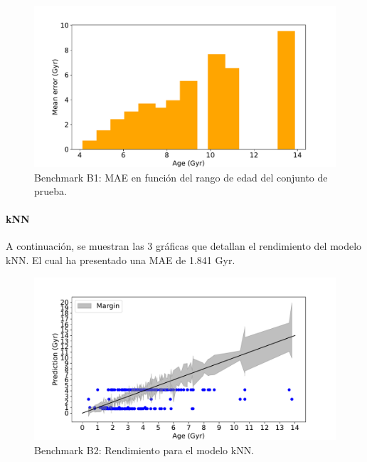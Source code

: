 \begin{figure}[H]
\begin{center}
 \includegraphics[width=0.8\linewidth]{Figuras/Experimentos/B_B1_gp_3.pdf}
\end{center}
\caption{Benchmark B1: MAE en función del rango de edad del conjunto de prueba.}
 \label{fig:benchB1_details_gp_3}
\end{figure}

\paragraph{kNN} 
A continuación, se muestran las 3 gráficas que detallan el rendimiento del modelo kNN. El cual ha presentado una MAE de 1.841 Gyr.

\begin{figure}[H]
\begin{center}
 \includegraphics[width=0.8\linewidth]{Figuras/Experimentos/B_B2_knn_1.pdf}
\end{center}
\caption{Benchmark B2: Rendimiento para el modelo kNN.}
 \label{fig:benchB2_details_knn_1}
\end{figure}

